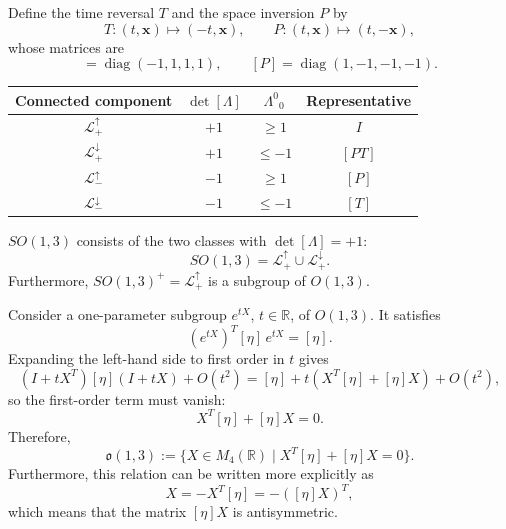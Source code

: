 \documentclass[11pt,a4paper]{article}
\newcommand{\topic}[1]{\par\addvspace{\medskipamount}\noindent{\bfseries\boldmath #1}\par\nopagebreak}
\begin{document}
Define the time reversal $T$ and the space inversion $P$ by
\begin{equation*}
T:(t,\mathbf x)\mapsto(-t,\mathbf x),\qquad
P:(t,\mathbf x)\mapsto(t,-\mathbf x),
\tag{0.25}\label{eq:0.25}
\end{equation*}
whose matrices are
\begin{equation*}
[T]=\operatorname{diag}(-1,1,1,1),\qquad
[P]=\operatorname{diag}(1,-1,-1,-1).
\tag{0.26}\label{eq:0.26}
\end{equation*}

\begin{center}
\renewcommand{\arraystretch}{1.2}
\begin{tabular}{cccc}
\toprule
Connected component & $\det[\Lambda]$ & $\Lambda^0{}_0$ & Representative \\
\midrule
$\mathcal L^\uparrow_+$ & $+1$ & $\ge1$ & $I$ \\
$\mathcal L^\downarrow_+$ & $+1$ & $\le-1$ & $[PT]$ \\
$\mathcal L^\uparrow_-$ & $-1$ & $\ge1$ & $[P]$ \\
$\mathcal L^\downarrow_-$ & $-1$ & $\le-1$ & $[T]$ \\
\bottomrule
\end{tabular}
\end{center}

$SO(1,3)$ consists of the two classes with $\det[\Lambda]=+1$:
\begin{equation*}
SO(1,3)=\mathcal L^\uparrow_+\cup\mathcal L^\downarrow_+.
\tag{0.27}\label{eq:0.27}
\end{equation*}
Furthermore, $SO(1,3)^+=\mathcal L^\uparrow_+$ is a subgroup of $O(1,3)$.

\bigskip

\topic{Lie Algebra of O(1,3)}

Consider a one-parameter subgroup $e^{tX}$, $t\in\mathbb R$, of $O(1,3)$. It satisfies
\begin{equation*}
(e^{tX})^T[\eta]\,e^{tX}=[\eta].
\tag{0.28}\label{eq:0.28}
\end{equation*}
Expanding the left-hand side to first order in $t$ gives
\begin{equation*}
(I+tX^T)[\eta](I+tX)+O(t^2)=[\eta]+t\left(X^T[\eta]+[\eta]X\right)+O(t^2),
\tag{0.29}\label{eq:0.29}
\end{equation*}
so the first-order term must vanish:
\begin{equation*}
X^T[\eta]+[\eta]X=0.
\tag{0.30}\label{eq:0.30}
\end{equation*}
Therefore,
\begin{equation*}
\mathfrak o(1,3):=\{X\in M_4(\mathbb R)\mid X^T[\eta]+[\eta]X=0\}.
\tag{0.31}\label{eq:0.31}
\end{equation*}
Furthermore, this relation can be written more explicitly as
\begin{equation*}
[\eta]X=-X^T[\eta]=-([\eta]X)^T,
\tag{0.32}\label{eq:0.32}
\end{equation*}
which means that the matrix $[\eta]X$ is antisymmetric.
\end{document}
